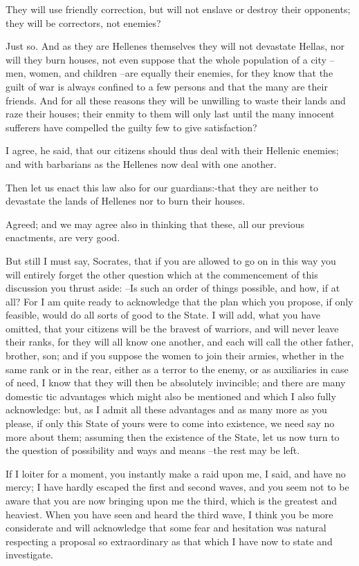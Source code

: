 They will use friendly correction, but will not enslave or destroy their opponents; they will be correctors, not enemies?

Just so.
And as they are Hellenes themselves they will not devastate Hellas, nor will they burn houses, not even suppose that the whole population of a city --men, women, and children --are equally their enemies, for they know that the guilt of war is always confined to a few persons and that the many are their friends. And for all these reasons they will be unwilling to waste their lands and raze their houses; their enmity to them will only last until the many innocent sufferers have compelled the guilty few to give satisfaction?

I agree, he said, that our citizens should thus deal with their Hellenic enemies; and with barbarians as the Hellenes now deal with one another.

Then let us enact this law also for our guardians:-that they are neither to devastate the lands of Hellenes nor to burn their houses.

Agreed; and we may agree also in thinking that these, all our previous enactments, are very good.

But still I must say, Socrates, that if you are allowed to go on in this way you will entirely forget the other question which at the commencement of this discussion you thrust aside: --Is such an order of things possible, and how, if at all? For I am quite ready to acknowledge that the plan which you propose, if only feasible, would do all sorts of good to the State. I will add, what you have omitted, that your citizens will be the bravest of warriors, and will never leave their ranks, for they will all know one another, and each will call the other father, brother, son; and if you suppose the women to join their armies, whether in the same rank or in the rear, either as a terror to the enemy, or as auxiliaries in case of need, I know that they will then be absolutely invincible; and there are many domestic tic advantages which might also be mentioned and which I also fully acknowledge: but, as I admit all these advantages and as many more as you please, if only this State of yours were to come into existence, we need say no more about them; assuming then the existence of the State, let us now turn to the question of possibility and ways and means --the rest may be left.

If I loiter for a moment, you instantly make a raid upon me, I said, and have no mercy; I have hardly escaped the first and second waves, and you seem not to be aware that you are now bringing upon me the third, which is the greatest and heaviest. When you have seen and heard the third wave, I think you be more considerate and will acknowledge that some fear and hesitation was natural respecting a proposal so extraordinary as that which I have now to state and investigate.

